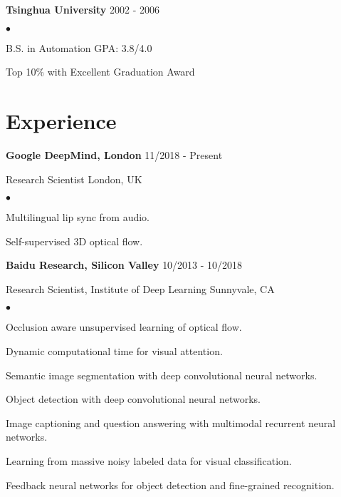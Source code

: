 \documentclass[margin]{res3}
\newenvironment{list1}{
  \begin{list}{\ding{113}}{%
      \setlength{\itemsep}{0.03in}
      \setlength{\parsep}{0in} \setlength{\parskip}{0in}
      \setlength{\topsep}{0in} \setlength{\partopsep}{0in}
      \setlength{\leftmargin}{0in}}}{\end{list}}
\newenvironment{list2}{
  \begin{list}{$\bullet$}{%
      \setlength{\itemsep}{0.02in}
      \setlength{\parsep}{0in} \setlength{\parskip}{0in}
      \setlength{\topsep}{0in} \setlength{\partopsep}{0in}
      \setlength{\leftmargin}{0.2in}}}{\end{list}}
\begin{document}
\begin{resume}
{\bf Tsinghua University} \hfill {2002 - 2006}
\begin{list2}
\item B.S. in Automation \hfill {GPA: 3.8/4.0}
\vspace{-2pt}
\item Top 10\% with Excellent Graduation Award
\end{list2}


\section{\sc Experience}

\begin{list1}

\item[] {\bf Google DeepMind, London} \hfill {11/2018 - Present}
\vspace{-2pt}
\item[] Research Scientist \hfill {London, UK}

\begin{list2}
\item Multilingual lip sync from audio.
\vspace{-2pt}
\item Self-supervised 3D optical flow.
\end{list2}
\vspace{5pt}


\item[] {\bf Baidu Research, Silicon Valley} \hfill {10/2013 - 10/2018}
\vspace{-2pt}
\item[] Research Scientist, Institute of Deep Learning \hfill {Sunnyvale, CA}

\begin{list2}
\item Occlusion aware unsupervised learning of optical flow.
\vspace{-2pt}
\item Dynamic computational time for visual attention.
\vspace{-2pt}
\item Semantic image segmentation with deep convolutional neural networks.
\vspace{-2pt}
\item Object detection with deep convolutional neural networks.
\vspace{-2pt}
\item Image captioning and question answering with multimodal recurrent neural networks.
\vspace{-2pt}
\item Learning from massive noisy labeled data for visual classification.
\vspace{-2pt}
\item Feedback neural networks for object detection and fine-grained recognition.
\end{list2}
\vspace{5pt}



\end{list1}
\end{resume}
\end{document}
